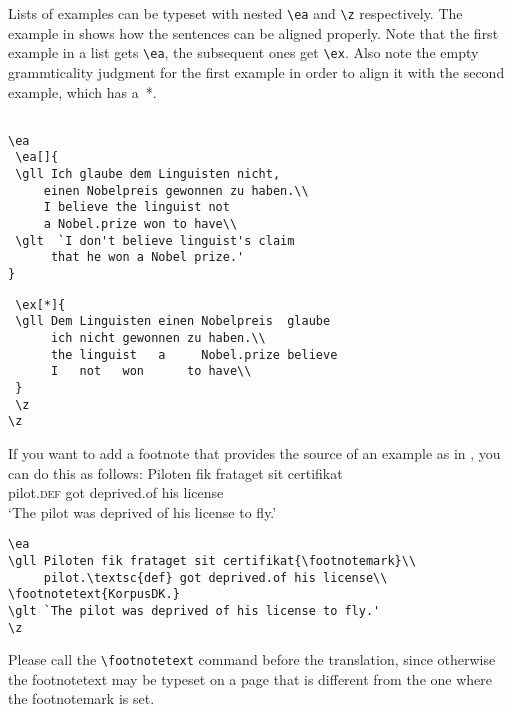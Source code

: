 Lists of examples can be typeset with nested \verb+\ea+  and \verb+\z+  respectively. The example in
 shows how the sentences can be aligned properly. Note that the first example in a list gets \verb+\ea+, the subsequent ones get \verb+\ex+. Also note the empty grammticality judgment for the first example in order to align it with the second example, which has a~*.


\ea  \label{ex:showcases:list}
\z
\z  

\begin{verbatim}

\ea 
 \ea[]{
 \gll Ich glaube dem Linguisten nicht, 
     einen Nobelpreis gewonnen zu haben.\\
     I believe the linguist not 
     a Nobel.prize won to have\\
 \glt  `I don't believe linguist's claim 
      that he won a Nobel prize.'
}
\end{verbatim}
\newpage
\begin{verbatim}
 \ex[*]{
 \gll Dem Linguisten einen Nobelpreis  glaube  
      ich nicht gewonnen zu haben.\\
      the linguist   a     Nobel.prize believe 
      I   not   won      to have\\
 }
 \z
\z
\end{verbatim}
 

If you want to add a footnote that provides the source of an example as in , you can do
this as follows:
\ea\label{ex:showcases:footnote}
\gll Piloten         fik frataget    sit certifikat\footnotemark\\
     pilot.\textsc{def} got deprived.of his license\\
\glt `The pilot was deprived of his license to fly.'
\z 
\begin{verbatim}
\ea
\gll Piloten fik frataget sit certifikat{\footnotemark}\\
     pilot.\textsc{def} got deprived.of his license\\
\footnotetext{KorpusDK.}
\glt `The pilot was deprived of his license to fly.'
\z 
\end{verbatim}
Please call the \verb+\footnotetext+ command before the translation, since otherwise the
footnotetext may be typeset on a page that is different from the one where the footnotemark is set.

